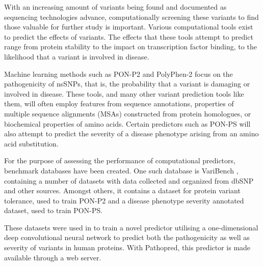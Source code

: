 \documentclass{bioinfo}
\begin{document}
With an increasing amount of variants being found and documented as sequencing technologies advance, computationally screening these variants to find those valuable for further study is important. Various computational tools exist to predict the effects of variants. The effects that these tools attempt to predict range from protein stability to the impact on transcription factor binding, to the likelihood that a variant is involved in disease. 

Machine learning methods such as PON-P2 \citep{Niroula2015} and PolyPhen-2 \citep{Adzhubei2013} focus on the pathogenicity of nsSNPs, that is, the probability that a variant is damaging or involved in disease. These tools, and many other variant prediction tools like them, will often employ features from sequence annotations, properties of multiple sequence alignments (MSAs) constructed from protein homologues, or biochemical properties of amino acids. Certain predictors such as PON-PS \citep{Niroula2017} will also attempt to predict the severity of a disease phenotype arising from an amino acid substitution. 

For the purpose of assessing the performance of computational predictors, benchmark databases have been created. One such database is VariBench \citep{Nair2013}, containing a number of datasets with data collected and organized from dbSNP and other sources. Amongst others, it contains a dataset for protein variant tolerance, used to train PON-P2 and a disease phenotype severity annotated dataset, used to train PON-PS.

These datasets were used in \citep{Kvist2018} to train a novel predictor utilising a one-dimensional deep convolutional neural network to predict both the pathogenicity as well as severity of variants in human proteins. With Pathopred, this predictor is made available through a web server.
\end{document}
